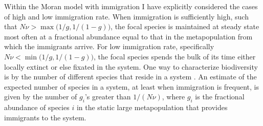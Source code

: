 
Within the Moran model with immigration I have explicitly considered the cases of high and low immigration rate. 
When immigration is sufficiently high, such that $N\nu > \max\big(1/g,1/(1-g)\big)$, the focal species is maintained at steady state most often at a fractional abundance equal to that in the metapopulation from which the immigrants arrive. 
For low immigration rate, specifically $N\nu < \min\big(1/g,1/(1-g)\big)$, the focal species spends the bulk of its time either locally extinct or else fixated in the system. 
One way to characterize biodiversity is by the number of different species that reside in a system \cite{May1999,Hubbell2001,others?,Chesson2000?}. 
An estimate of the expected number of species in a system, at least when immigration is frequent, is given by the number of $g_i$'s greater than $1/(N\nu)$, where $g_i$ is the fractional abundance of species $i$ in the static large metapopulation that provides immigrants to the system. 


